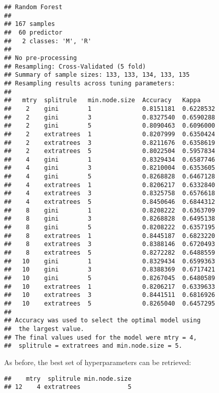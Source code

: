 \documentclass[
]{book}
\newenvironment{Shaded}{\begin{snugshade}}{\end{snugshade}}
\newcommand{\NormalTok}[1]{#1}
\newcommand{\SpecialCharTok}[1]{\textcolor[rgb]{0.00,0.00,0.00}{#1}}
\begin{document}
\begin{verbatim}
## Random Forest 
## 
## 167 samples
##  60 predictor
##   2 classes: 'M', 'R' 
## 
## No pre-processing
## Resampling: Cross-Validated (5 fold) 
## Summary of sample sizes: 133, 133, 134, 133, 135 
## Resampling results across tuning parameters:
## 
##   mtry  splitrule   min.node.size  Accuracy   Kappa    
##    2    gini        1              0.8151181  0.6228532
##    2    gini        3              0.8327540  0.6590288
##    2    gini        5              0.8090463  0.6096000
##    2    extratrees  1              0.8207999  0.6350424
##    2    extratrees  3              0.8211676  0.6358619
##    2    extratrees  5              0.8022504  0.5957834
##    4    gini        1              0.8329434  0.6587746
##    4    gini        3              0.8210004  0.6353605
##    4    gini        5              0.8268828  0.6467128
##    4    extratrees  1              0.8206217  0.6332840
##    4    extratrees  3              0.8325758  0.6576618
##    4    extratrees  5              0.8450646  0.6844312
##    8    gini        1              0.8208222  0.6363709
##    8    gini        3              0.8268828  0.6495138
##    8    gini        5              0.8208222  0.6357195
##    8    extratrees  1              0.8445187  0.6823220
##    8    extratrees  3              0.8388146  0.6720493
##    8    extratrees  5              0.8272282  0.6488559
##   10    gini        1              0.8329434  0.6599363
##   10    gini        3              0.8388369  0.6717421
##   10    gini        5              0.8267045  0.6480589
##   10    extratrees  1              0.8206217  0.6339633
##   10    extratrees  3              0.8441511  0.6816926
##   10    extratrees  5              0.8265040  0.6457295
## 
## Accuracy was used to select the optimal model using
##  the largest value.
## The final values used for the model were mtry = 4,
##  splitrule = extratrees and min.node.size = 5.
\end{verbatim}

As before, the best set of hyperparameters can be retrieved:

\begin{Shaded}
\end{Shaded}

\begin{verbatim}
##    mtry  splitrule min.node.size
## 12    4 extratrees             5
\end{verbatim}
\end{document}
